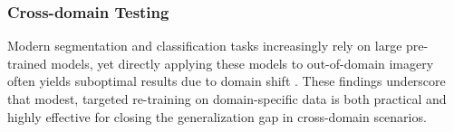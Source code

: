 \documentclass[12pt]{article}
\begin{document}
\begin{table}[htbp]
\centering
\caption{Model performance on the unseen Krestinin test set (\(n = 569\) tiles). Results are reported as per-class IoU and mean IoU (\%).}
\label{tab:krestinin_test}
\end{table}


\subsubsection{Cross-domain Testing}
Modern segmentation and classification tasks increasingly rely on large pre-trained models, yet directly applying these models to out-of-domain imagery often yields suboptimal results due to domain shift \cite{pratapFineArtFinetuning2025}.  These findings underscore that modest, targeted re-training on domain-specific data is both practical and highly effective for closing the generalization gap in cross-domain scenarios. 
\end{document}
